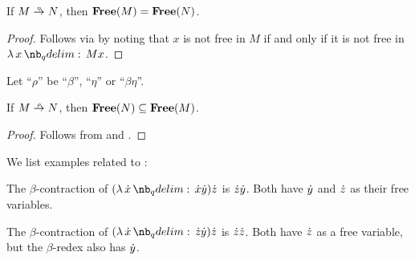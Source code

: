 \begin{proposition}\label{thm:eta_reduction_free_variables_equal}
  If \( M \ered N \), then \( \op*{Free}(M) = \op*{Free}(N) \).
\end{proposition}
\begin{proof}
  Follows via  by noting that \( x \) is not free in \( M \) if and only if it is not free in \( \qabs x M x \).
\end{proof}

\begin{proposition}\label{thm:beta_eta_reduction_free_variables_contra}
  Let \enquote{\( \rho \)} be \enquote{\( \beta \)}, \enquote{\( \eta \)} or \enquote{\( \beta\eta \)}.

  If \( M \rred N \), then \( \op*{Free}(N) \subseteq \op*{Free}(M) \).
\end{proposition}
\begin{proof}
  Follows from  and .
\end{proof}

\begin{example}\label{ex:thm:beta_reduction_free_variables}
  We list examples related to :
  \begin{thmenum}
     The \( \beta \)-contraction of \( (\qabs \synx \synx \syny) \synz \) is \( {\dot{z}} {\dot{y}} \). Both have \( {\dot{y}} \) and \( {\dot{z}} \) as their free variables.

     The \( \beta \)-contraction of \( (\qabs \synx \synz \syny) \synz \) is \( {\dot{z}} {\dot{z}} \). Both have \( {\dot{z}} \) as a free variable, but the \( \beta \)-redex also has \( {\dot{y}} \).
  \end{thmenum}
\end{example}

